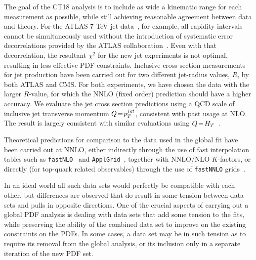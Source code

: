 The goal of the CT18 analysis is to include as wide a kinematic range for each measurement as possible, while still achieving reasonable agreement between data and theory. For the ATLAS
7 TeV jet data~\cite{Aad:2014vwa}, for example, all rapidity intervals cannot be simultaneously used without the introduction of systematic error decorrelations provided by the ATLAS collaboration~\cite{Aaboud:2017dvo}. Even with that decorrelation, the resultant $\chi^2$ for the new jet experiments is not optimal, resulting in less effective PDF constraints. Inclusive cross section measurements for jet production have been carried out for two different jet-radius values, $R$, by both ATLAS and CMS. For both experiments, we have chosen the data with the larger $R$-value, for which the NNLO (fixed order) prediction should have a higher accuracy. We evaluate the jet cross section predictions using a QCD scale of inclusive jet transverse momentum $Q\! =\! p_T^{jet}$, consistent with past usage at NLO. The  result is largely consistent with similar evaluations using
$Q\! =\! H_T$~\cite{Currie:2016bfm,Currie:2017ctp,Currie:2018xkj}.

Theoretical predictions for comparison to the data used in the global fit have been carried out at NNLO, either indirectly through the use of fast interpolation tables such
as \texttt{fastNLO}~\cite{Britzger:2012bs,Wobisch:2011ij} and  \texttt{ApplGrid}~\cite{Carli:2010rw}, together with NNLO/NLO $K$-factors, or directly (for top-quark related observables) through
the use of \texttt{fastNNLO} grids~\cite{Czakon:2017dip,fastnnlo:grids}. 

In an ideal world all such data sets would perfectly be compatible with each other, but differences are observed that do result in some tension between data sets and pulls in opposite directions.
One of the crucial aspects of carrying out a global PDF analysis is dealing with data sets that add some tension to the fits, while preserving the ability of the combined data set to improve on the existing constraints on the PDFs. In some cases, a data set may be in such tension as to require its removal from the global analysis, or its inclusion only in a separate iteration of the new PDF set. 

